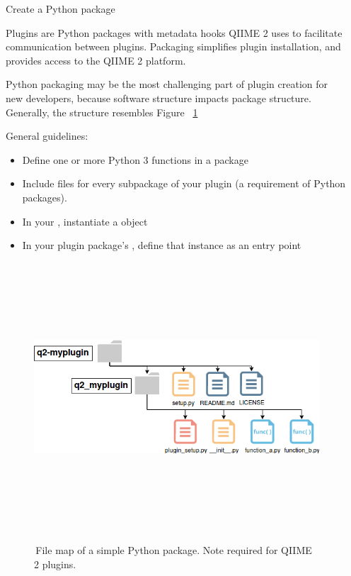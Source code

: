 \documentclass[final]{beamer}
\newlength{\sepwidth}
\newlength{\colwidth}
\newcommand{\separatorcolumn}{\begin{column}{\sepwidth}\end{column}}
\begin{document}
\begin{frame}[t]
\begin{columns}[t]
\separatorcolumn

\begin{column}{\colwidth}

  \begin{block}{Create a Python package}

    Plugins are Python packages with metadata hooks QIIME 2 uses to facilitate
    communication between plugins. Packaging
    simplifies plugin installation, and provides access to the QIIME 2 platform.

    \begin{tcolorbox}
    [width=\textwidth, colframe=blue]
    {Python packaging may be the most challenging part of plugin creation
    for new developers, because software structure impacts package structure.
    Generally, the structure resembles Figure ~\ref{fig:packageStructure}}
    \end{tcolorbox}

    General guidelines:
    \begin{itemize}
      \item Define one or more Python 3 functions in a package
      \item Include  files for every subpackage of your
      plugin (a requirement of Python packages).
      \item In your , instantiate a  object
      \item In your plugin package's , define that instance as an entry point
    \end{itemize}
  \end{block}

  \begin{figure}[tph!]
    {\includegraphics[height=10cm]{assets/packageStructure}}
    \caption{\,File map of a simple Python package. Note  required for QIIME 2 plugins.}
    \label{fig:packageStructure}
  \end{figure}


\end{column}
\end{columns}
\end{frame}
\end{document}
